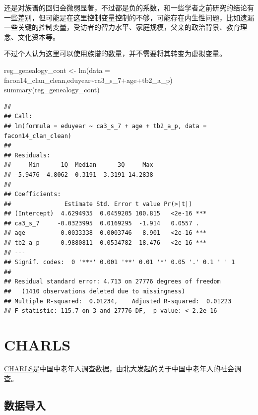 \documentclass[
  oneside]{book}
\newenvironment{Shaded}{\begin{snugshade}}{\end{snugshade}}
\newcommand{\AttributeTok}[1]{\textcolor[rgb]{0.77,0.63,0.00}{#1}}
\newcommand{\FunctionTok}[1]{\textcolor[rgb]{0.00,0.00,0.00}{#1}}
\newcommand{\NormalTok}[1]{#1}
\newcommand{\OtherTok}[1]{\textcolor[rgb]{0.56,0.35,0.01}{#1}}
\newcommand{\SpecialCharTok}[1]{\textcolor[rgb]{0.00,0.00,0.00}{#1}}
\begin{document}
还是对族谱的回归会微弱显著，不过都是负的系数，和一些学者之前研究的结论有一些差别，但可能是在这里控制变量控制的不够，可能存在内生性问题，比如遗漏一些关键的控制变量，受访者的智力水平、家庭规模，父亲的政治背景、教育理念、文化资本等。

不过个人认为这里可以使用族谱的数量，并不需要将其转变为虚拟变量。

\begin{Shaded}
\begin{Highlighting}[]
\NormalTok{reg\_genealogy\_cont }\OtherTok{\textless{}{-}} \FunctionTok{lm}\NormalTok{(}\AttributeTok{data =}\NormalTok{ facon14\_clan\_clean,eduyear}\SpecialCharTok{\textasciitilde{}}\NormalTok{ca3\_s\_7}\SpecialCharTok{+}\NormalTok{age}\SpecialCharTok{+}\NormalTok{tb2\_a\_p)}
\FunctionTok{summary}\NormalTok{(reg\_genealogy\_cont)}
\end{Highlighting}
\end{Shaded}

\begin{verbatim}
## 
## Call:
## lm(formula = eduyear ~ ca3_s_7 + age + tb2_a_p, data = facon14_clan_clean)
## 
## Residuals:
##     Min      1Q  Median      3Q     Max 
## -5.9476 -4.8062  0.3191  3.3191 14.2838 
## 
## Coefficients:
##               Estimate Std. Error t value Pr(>|t|)    
## (Intercept)  4.6294935  0.0459205 100.815   <2e-16 ***
## ca3_s_7     -0.0323995  0.0169295  -1.914   0.0557 .  
## age          0.0033338  0.0003746   8.901   <2e-16 ***
## tb2_a_p      0.9880811  0.0534782  18.476   <2e-16 ***
## ---
## Signif. codes:  0 '***' 0.001 '**' 0.01 '*' 0.05 '.' 0.1 ' ' 1
## 
## Residual standard error: 4.713 on 27776 degrees of freedom
##   (1410 observations deleted due to missingness)
## Multiple R-squared:  0.01234,    Adjusted R-squared:  0.01223 
## F-statistic: 115.7 on 3 and 27776 DF,  p-value: < 2.2e-16
\end{verbatim}

\hypertarget{charls}{%
\chapter{CHARLS}\label{charls}}

\href{http://charls.pku.edu.cn/}{CHARLS}是中国中老年人调查数据，由北大发起的关于中国中老年人的社会调查。

\hypertarget{ux6570ux636eux5bfcux5165}{%
\section{数据导入}\label{ux6570ux636eux5bfcux5165}}
\end{document}
